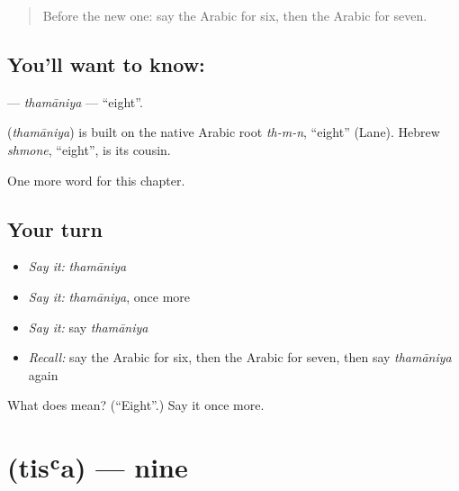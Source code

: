 \label{lesson:AR-C96-thamaniya}



\begin{quote}
Before the new one: say the Arabic for six, then the Arabic for seven.
\end{quote}

\subsection*{You'll want to know: }
\textbf{} — \emph{thamāniya} — \textquotedblleft{}eight\textquotedblright{}.

\begin{cousinweb}
\textbf{} (\emph{thamāniya}) is built on the native Arabic root \emph{th-m-n}, \textquotedblleft{}eight\textquotedblright{} (Lane). Hebrew \emph{shmone}, \textquotedblleft{}eight\textquotedblright{}, is its cousin.
\end{cousinweb}

\begin{grammarlens}[title={What you've built}]
One more word for this chapter.
\end{grammarlens}

\subsection*{Your turn}
\begin{itemize}
\raggedright
  \item \emph{Say it:} \emph{thamāniya}
  \item \emph{Say it:} \emph{thamāniya}, once more
  \item \emph{Say it:} say \emph{thamāniya}
  \item \emph{Recall:} say the Arabic for six, then the Arabic for seven, then say \emph{thamāniya} again
\end{itemize}

\begin{tcolorbox}[breakable,colback=teal!4,colframe=teal!35!black,title={Before you move on}]
What does  mean? (\textquotedblleft{}Eight\textquotedblright{}.) Say it once more.
\end{tcolorbox}
\section[\texorpdfstring{\ar{تسعة} (tisʿa)}{تسعة (tisʿa)}]{ (tisʿa) — nine}

\label{lesson:AR-C96-tisa}



